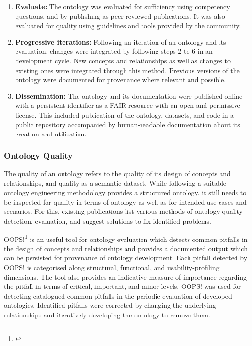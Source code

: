 \begin{enumerate}
    \item \textbf{Evaluate:} The ontology was evaluated for sufficiency using competency questions, and by publishing as peer-reviewed publications. It was also evaluated for quality using guidelines and tools provided by the community.
    \item \textbf{Progressive iterations:} Following an iteration of an ontology and its evaluation, changes were integrated by following steps 2 to 6 in an development cycle. New concepts and relationships as well as changes to existing ones were integrated through this method. Previous versions of the ontology were documented for provenance where relevant and possible.
    \item \textbf{Dissemination:} The ontology and its documentation were published online with a persistent identifier as a FAIR resource with an open and permissive license. This included publication of the ontology, datasets, and code in a public repository accompanied by human-readable documentation about its creation and utilisation.
\end{enumerate}

\subsubsection*{Ontology Quality}
The quality of an ontology refers to the quality of its design of concepts and relationships, and quality as a semantic dataset. While following a suitable ontology engineering methodology provides a structured ontology, it still needs to be inspected for quality in terms of ontology as well as for intended use-cases and scenarios. For this, existing publications \cite{jeremy-quality paper,vredicic-thesis} list various methods of ontology quality detection, evaluation, and suggest solutions to fix identified problems.

OOPS!\footnote{\url{}} \cite{} is an useful tool for ontology evaluation which detects common pitfalls in the design of concepts and relationships and provides a documented output which can be persisted for provenance of ontology development. Each pitfall detected by OOPS! is categorised along  structural, functional, and usability-profiling dimensions. The tool also provides an indicative measure of importance regarding the pitfall in terms of critical, important, and minor levels.
OOPS! was used for detecting catalogued common pitfalls in the periodic evaluation of developed ontologies. Identified pitfalls were corrected by changing the underlying relationships and iteratively developing the ontology to remove them. 


